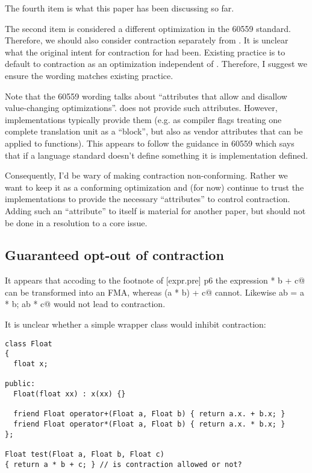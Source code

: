 The fourth item is what this paper has been discussing so far.

The second item is considered a different optimization in the 60559 standard.
Therefore, we should also consider \fp contraction separately from
.
It is unclear what the original intent for \fp contraction for \CC{} had been.
Existing practice is to default to \fp contraction as an optimization
independent of .
Therefore, I suggest we ensure the wording matches existing practice.

Note that the 60559 wording talks about “attributes that allow and disallow
value-changing optimizations”.
\CC{} does not provide such attributes.
However, implementations typically provide them (e.g. as compiler flags
treating one complete translation unit as a “block”, but also as vendor
attributes that can be applied to functions).
This appears to follow the guidance in 60559 which says that if a language
standard doesn't define something it is implementation defined.

Consequently, I'd be wary of making \fp contraction non-conforming.
Rather we want to keep it as a conforming optimization and (for now) continue
to trust the implementations to provide the necessary “attributes” to control
\fp contraction.
Adding such an “attribute” to \CC{} itself is material for another paper, but
should not be done in a resolution to a core issue.

\subsection{Guaranteed opt-out of \fp contraction}

It appears that accoding to the footnote of [expr.pre] p6 the expression
\lstinline@a * b + c@ can be transformed into an FMA, whereas
\lstinline@auto(a * b) + c@ cannot.
Likewise \lstinline@auto ab = a * b; ab * c@ would not lead to \fp contraction.

It is unclear whether a simple \fp wrapper class would inhibit \fp contraction:
\medskip
\begin{lstlisting}
class Float
{
  float x;

public:
  Float(float xx) : x(xx) {}

  friend Float operator+(Float a, Float b) { return a.x. + b.x; }
  friend Float operator*(Float a, Float b) { return a.x. * b.x; }
};

Float test(Float a, Float b, Float c)
{ return a * b + c; } // is contraction allowed or not?
\end{lstlisting}

